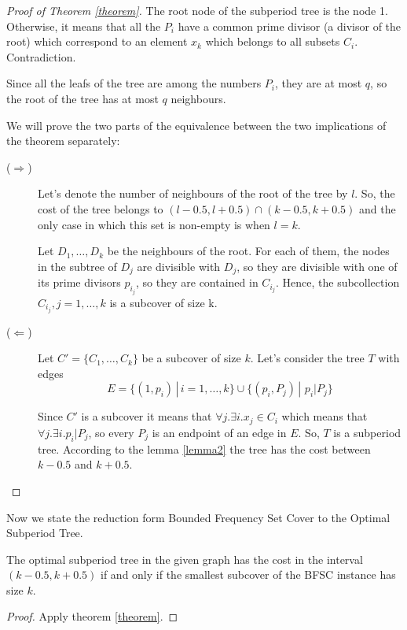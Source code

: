 \begin{proof}[Proof of Theorem \ref{theorem}]
The root node of the subperiod tree is the node 1. Otherwise, it means that all the $P_i$ have a common prime divisor (a divisor of the root) which correspond to an element $x_k$ which belongs to all subsets $C_i$. Contradiction.

Since all the leafs of the tree are among the numbers $P_i$, they are at most $q$, so the root of the tree has at most $q$ neighbours.

We will prove the two parts of the equivalence between the two implications of the theorem separately:

\begin{description}
\item[($\Rightarrow$)] 
Let's denote the number of neighbours of the root of the tree by $l$. So, the cost of the tree belongs to $(l-0.5, l+0.5)\cap (k-0.5,k+0.5)$ and the only case in which this set is non-empty is when $l=k$.

Let $D_1, \ldots, D_k$ be the neighbours of the root. For each of them, the nodes in the subtree of $D_j$ are divisible with $D_j$, so they are divisible with one of its prime divisors $p_{i_j}$, so they are contained in $C_{i_j}$. Hence, the subcollection $C_{i_j},j=1,\ldots,k$ is a subcover of size k.

\item[($\Leftarrow$)] Let $C'=\{C_1,\ldots,C_k\}$ be a subcover of size $k$. Let's consider the tree $T$ with edges 
$$E = \{(1, p_i) \,|\, i=1,\ldots, k\} \cup \{(p_i, P_j) \,| \,\, p_i | P_j\}$$

Since $C'$ is a subcover it means that $\forall j. \exists i. x_j \in C_i$ which means that $\forall j. \exists i. p_i \vert P_j$, so every $P_j$ is an endpoint of an edge in $E$. So, $T$ is a subperiod tree. According to the lemma \ref{lemma2} the tree has the cost between $k-0.5$ and $k+0.5$.

\end{description}\end{proof}

Now we state the reduction form Bounded Frequency Set Cover to the Optimal Subperiod Tree.
\begin{theorem}
The optimal subperiod tree in the given graph has the cost in the interval $(k-0.5, k+0.5)$ if and only if the smallest subcover of the BFSC instance has size $k$.
\end{theorem}

\begin{proof}
Apply theorem \ref{theorem}.
\end{proof}

